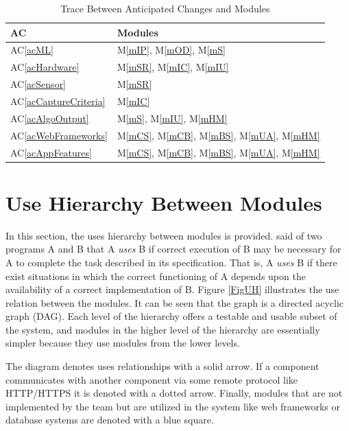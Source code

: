 \documentclass[12pt, titlepage]{article}
\newcommand{\acref}[1]{AC\ref{#1}}
\newcommand{\mref}[1]{M\ref{#1}}
\begin{document}
\begin{table}[H]
\centering
\begin{tabular}{p{} p{}}
\toprule
\textbf{AC} & \textbf{Modules}\\
\midrule
\acref{acML} & \mref{mIP}, \mref{mOD}, \mref{mS} \\
\acref{acHardware} & \mref{mSR}, \mref{mIC}, \mref{mIU} \\
\acref{acSensor} & \mref{mSR} \\
\acref{acCaptureCriteria} & \mref{mIC} \\
\acref{acAlgoOutput} & \mref{mS}, \mref{mIU}, \mref{mHM} \\
\acref{acWebFrameworks} & \mref{mCS}, \mref{mCB}, \mref{mBS}, \mref{mUA}, \mref{mHM} \\
\acref{acAppFeatures} & \mref{mCS}, \mref{mCB}, \mref{mBS}, \mref{mUA}, \mref{mHM} \\
\bottomrule
\end{tabular}
\caption{Trace Between Anticipated Changes and Modules}
\label{TblACT}
\end{table}

\section{Use Hierarchy Between Modules} \label{SecUse}

In this section, the uses hierarchy between modules is
provided. \citet{Parnas1978} said of two programs A and B that A {\em uses} B if
correct execution of B may be necessary for A to complete the task described in
its specification. That is, A {\em uses} B if there exist situations in which
the correct functioning of A depends upon the availability of a correct
implementation of B.  Figure \ref{FigUH} illustrates the use relation between
the modules. It can be seen that the graph is a directed acyclic graph
(DAG). Each level of the hierarchy offers a testable and usable subset of the
system, and modules in the higher level of the hierarchy are essentially simpler
because they use modules from the lower levels.

The diagram denotes uses relationships with a solid arrow. If a component  communicates with another component via some remote protocol like HTTP/HTTPS it is denoted with a dotted arrow. Finally, modules that are not implemented by the team but are utilized in the system like web frameworks or database systems are denoted with a blue square.
\end{document}
